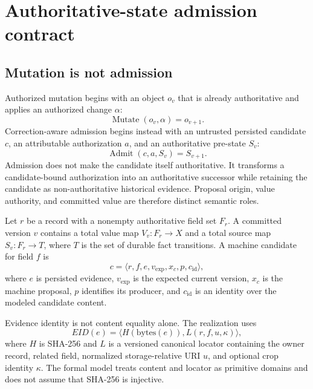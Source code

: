 \section{Authoritative-state admission contract}
\label{sec:contract}

\subsection{Mutation is not admission}

Authorized mutation begins with an object $o_v$ that is already authoritative and applies an authorized change $\alpha$:
\begin{equation}
\operatorname{Mutate}(o_v,\alpha)=o_{v+1}.
\end{equation}
Correction-aware admission begins instead with an untrusted persisted candidate $c$, an attributable authorization $a$, and an authoritative pre-state $S_v$:
\begin{equation}
\operatorname{Admit}(c,a,S_v)=S_{v+1}.
\label{eq:admit}
\end{equation}
Admission does not make the candidate itself authoritative. It transforms a candidate-bound authorization into an authoritative successor while retaining the candidate as non-authoritative historical evidence. Proposal origin, value authority, and committed value are therefore distinct semantic roles.

Let $r$ be a record with a nonempty authoritative field set $F_r$. A committed version $v$ contains a total value map $V_v:F_r\rightarrow X$ and a total source map $S_v:F_r\rightarrow T$, where $T$ is the set of durable fact transitions. A machine candidate for field $f$ is
\begin{equation}
c=\langle r,f,e,v_{\mathrm{exp}},x_c,p,c_{\mathrm{id}}\rangle,
\label{eq:candidate}
\end{equation}
where $e$ is persisted evidence, $v_{\mathrm{exp}}$ is the expected current version, $x_c$ is the machine proposal, $p$ identifies its producer, and $c_{\mathrm{id}}$ is an identity over the modeled candidate content.

Evidence identity is not content equality alone. The realization uses
\begin{equation}
EID(e)=\langle H(\mathrm{bytes}(e)),L(r,f,u,\kappa)\rangle,
\label{eq:evidence}
\end{equation}
where $H$ is SHA-256 and $L$ is a versioned canonical locator containing the owner record, related field, normalized storage-relative URI $u$, and optional crop identity $\kappa$. The formal model treats content and locator as primitive domains and does not assume that SHA-256 is injective.

